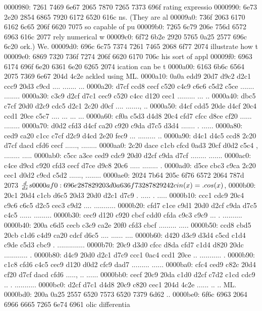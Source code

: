 0000980: 7261 7469 6e67 2065 7870 7265 7373 696f  rating expressio
0000990: 6e73 2e20 2854 6865 7920 6172 6520 616c  ns. (They are al
00009a0: 736f 2063 6170 6162 6c65 206f 6620 7075  so capable of pu
00009b0: 7265 6c79 206e 756d 6572 6963 616c 2077  rely numerical w
00009c0: 6f72 6b2e 2920 5765 0a25 2577 696c 6c20  ork.) We.%
00009d0: 696c 6c75 7374 7261 7465 2068 6f77 2074  illustrate how t
00009e0: 6869 7320 736f 7274 206f 6620 6170 706c  his sort of appl
00009f0: 6963 6174 696f 6e20 6361 6e20 6265 2074  ication can be t
0000a00: 6163 6b6c 6564 2075 7369 6e67 204d 4c2e  ackled using ML.
0000a10: 0a0a edd9 20d7 d9c2 d2c1 ccc9 20d3 c9cd  .... ....... ...
0000a20: d7cf ccd8 cecf c520 c4c9 c6c6 c5d2 c5ce  ....... ........
0000a30: c3c9 d2cf d7c1 cec9 c520 c4cc d120 cec1  ......... ... ..
0000a40: dbc5 c7cf 20d0 d2c9 cdc5 d2c1 2c20 d0cf  .... ......., ..
0000a50: d4cf cdd5 20de d4cf 20c4 ccd1 20ce c5c7  .... ... ... ...
0000a60: cf0a c5d3 d4d8 20c4 cfd7 cfcc d8ce cf20  ...... ........ 
0000a70: d0d2 cfd3 d4cf ca20 c920 c9da d7c5 d3d4  ....... . ......
0000a80: ced9 ca20 c1cc c7cf d2c9 d4cd 2e20 fec9  ... ......... ..
0000a90: d4c1 d4c5 ccd8 2c20 d7cf dacd cfd6 cecf  ......, ........
0000aa0: 2c20 dace c1cb cfcd 0ad3 20cf d0d2 c5c4  , ........ .....
0000ab0: c5cc a3ce ced9 cdc9 20d0 d2cf c9da d7cf  ........ .......
0000ac0: c4ce d9cd c920 cfd3 cecf d7ce d9c8 20c6  ..... ........ .
0000ad0: d5ce cbc3 c9ca 2c20 cec1 d0d2 c9cd c5d2  ......, ........
0000ae0: 2024 7b64 205c 6f76 6572 2064 787d 2073   ${d \over dx} s
0000af0: 696e 2878 2920 3d0a 636f 7328 7829 242c  in(x) =.cos(x)$,
0000b00: 20c1 20d4 c1cb d6c5 20d3 20d0 d2c1 d7c9   . ..... . .....
0000b10: ccc1 cdc9 20c4 c9c6 c6c5 d2c5 cec3 c9d2  .... ...........
0000b20: cfd7 c1ce c9d1 20d0 d2cf c9da d7c5 c4c5  ...... .........
0000b30: cec9 d120 c920 cbcf cdd0 cfda c9c3 c9c9  ... . ..........
0000b40: 200a c6d5 cecb c3c9 ca2e 20f0 cfd3 cbcf   ......... .....
0000b50: ccd8 cbd5 20cb c1d6 c4d9 ca20 cdcf d6c5  .... ...... ....
0000b60: d420 d3c9 d3d4 c5cd c1d4 c9de c5d3 cbc9  . ..............
0000b70: 20c9 d3d0 cfcc d8da cfd7 c1d4 d820 20dc   ............  .
0000b80: d4c9 20d0 d2c1 d7c9 ccc1 0ac4 ccd1 20ce  .. ........... .
0000b90: c1c8 cfd6 c4c5 cec9 d120 d0d2 cfc9 dad7  ......... ......
0000ba0: cfc4 ced9 c82c 20d4 cf20 d7cf dacd cfd6  ....., .. ......
0000bb0: cecf 20c9 20da c1d0 d2cf c7d2 c1cd cdc9  .. . ...........
0000bc0: d2cf d7c1 d4d8 20c9 c820 cec1 204d 4c2e  ...... .. .. ML.
0000bd0: 200a 0a25 2557 6520 7573 6520 7379 6d62   ..%
0000be0: 6f6c 6963 2064 6966 6665 7265 6e74 6961  olic differentia
